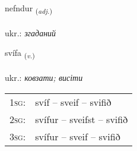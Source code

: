 \documentclass[frontgrid, backgrid]{flacards}\usepackage[]{graphicx}\usepackage[]{xcolor}
\begin{document}
\renewcommand{\flhead}{\vskip5pt \fboxsep=0pt {\small\bfseries\footnotesize Lýsingarorð | прикметник}}
\renewcommand{\fcfoot}{\vskip5pt \fboxsep=0pt \hspace{2pt}{\small\bfseries\footnotesize 3K}}

\renewcommand{\blhead}{\vskip5pt {\small\bfseries\footnotesize Lýsingarorð | прикметник }}
\renewcommand{\bcfoot}{\vskip5pt \hspace{2pt}{\small\bfseries\footnotesize 3K}}


{nefndur \small{\textsubscript{(\textit{adj.})}} \\[1ex] %
\textphonetic{[nɛmtʏr]} \\
ukr.: \emph{згаданий} \\  [2ex]
\renewcommand*{\arraystretch}{0.8}
}

\renewcommand{\flhead}{\vskip5pt \fboxsep=0pt {\small\bfseries\footnotesize Sagnorð | дієслово}}
\renewcommand{\fcfoot}{\vskip5pt \fboxsep=0pt \hspace{2pt}{\small\bfseries\footnotesize 3K}}

\renewcommand{\blhead}{\vskip5pt {\small\bfseries\footnotesize Sagnorð | дієслово }}
\renewcommand{\bcfoot}{\vskip5pt \hspace{2pt}{\small\bfseries\footnotesize 3K}}


{svífa \small{\textsubscript{(\textit{v.})}} \\[1ex] %
\textphonetic{[sviːva]} \\
ukr.: \emph{ковзати; висіти} \\  [2ex]
\renewcommand*{\arraystretch}{0.8}
\begin{tabular}{p{1cm}l}
\textsc{1sg}: & svíf -- sveif -- svifið \\ 
\textsc{2sg}: & svífur -- sveifst -- svifið \\ 
\textsc{3sg}: & svífur -- sveif -- svifið \\ 
\end{tabular}
}
\end{document}
